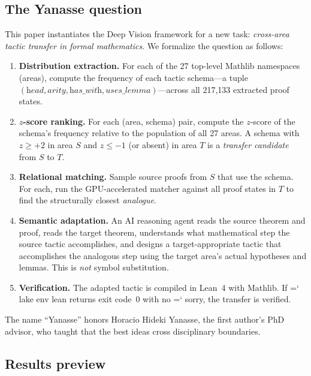 \documentclass[11pt]{article}
\renewcommand{\texttt}[1]{%
  \begingroup\ttfamily\hyphenchar\font=`\-\relax
  \def\_{\textunderscore\discretionary{}{}{}}%
  #1\endgroup}
\theoremstyle{definition}
\theoremstyle{remark}
\begin{document}
\subsection{The Yanasse question}

This paper instantiates the Deep Vision framework for a new task:
\emph{cross-area tactic transfer in formal mathematics}.  We formalize
the question as follows:

\begin{enumerate}
\item \textbf{Distribution extraction.}  For each of the 27 top-level
  Mathlib namespaces (areas), compute the frequency of each tactic
  schema---a tuple $(\textit{head}, \textit{arity},
  \textit{has\_with}, \textit{uses\_lemma})$---across all 217{,}133
  extracted proof states.

\item \textbf{$z$-score ranking.}  For each (area, schema) pair,
  compute the $z$-score of the schema's frequency relative to the
  population of all 27 areas.  A schema with $z \geq +2$ in area $S$
  and $z \leq -1$ (or absent) in area $T$ is a \emph{transfer
  candidate} from $S$ to $T$.

\item \textbf{Relational matching.}  Sample source proofs from $S$
  that use the schema.  For each, run the GPU-accelerated matcher against all
  proof states in $T$ to find the structurally closest
  \emph{analogue}.

\item \textbf{Semantic adaptation.}  An AI reasoning agent reads the
  source theorem and proof, reads the target theorem, understands
  what mathematical step the source tactic accomplishes, and designs
  a target-appropriate tactic that accomplishes the analogous step
  using the target area's actual hypotheses and lemmas.  This is
  \emph{not} symbol substitution.

\item \textbf{Verification.}  The adapted tactic is compiled in
  Lean~4 with Mathlib.  If \texttt{lake env lean} returns exit
  code~0 with no \texttt{sorry}, the transfer is verified.
\end{enumerate}

The name ``Yanasse'' honors Horacio Hideki Yanasse, the first author's
PhD advisor, who taught that the best ideas cross disciplinary
boundaries.

\subsection{Results preview}
\end{document}
